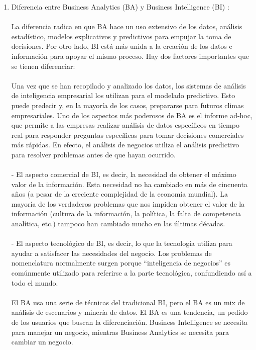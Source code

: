 \begin{enumerate}[3.]
	\item Diferencia entre Business Analytics (BA) y Business Intelligence (BI) :
\\
\\
La diferencia radica en que BA hace un uso extensivo de los datos, análisis estadístico, modelos explicativos y predictivos para empujar la toma de decisiones. Por otro lado, BI está más unida a la creación de los datos e información para apoyar el mismo proceso. Hay dos factores importantes que se tienen diferenciar:
\\
\\
Una vez que se han recopilado y analizado los datos, los sistemas de análisis de inteligencia empresarial los utilizan para el modelado predictivo. Esto puede predecir y, en la mayoría de los casos, prepararse para futuros climas empresariales. Uno de los aspectos más poderosos de BA es el informe ad-hoc, que permite a las empresas realizar análisis de datos específicos en tiempo real para responder preguntas específicas para tomar decisiones comerciales más rápidas. En efecto, el análisis de negocios utiliza el análisis predictivo para resolver problemas antes de que hayan ocurrido.
\\
\\
	- El aspecto comercial de BI, es decir, la necesidad de obtener el máximo valor de la información. Esta necesidad no ha cambiado en más de cincuenta años (a pesar de la creciente complejidad de la economía mundial). La mayoría de los verdaderos problemas que nos impiden obtener el valor de la información (cultura de la información, la política, la falta de competencia analítica, etc.) tampoco han cambiado mucho en las últimas décadas.
\\
\\
	- El aspecto tecnológico de BI, es decir, lo que la tecnología utiliza para ayudar a satisfacer las necesidades del negocio. Los problemas de nomenclatura normalmente surgen porque “inteligencia de negocios” es comúnmente utilizado para referirse a la parte tecnológica, confundiendo así a todo el mundo.
\\
\\
El BA usa una serie de técnicas del tradicional BI, pero el BA es un mix de análisis de escenarios y minería de datos. El BA es una tendencia, un pedido de los usuarios que buscan la diferenciación. Business Intelligence se necesita para manejar un negocio, mientras Business Analytics se necesita para cambiar un negocio.
\\

\end{enumerate}

